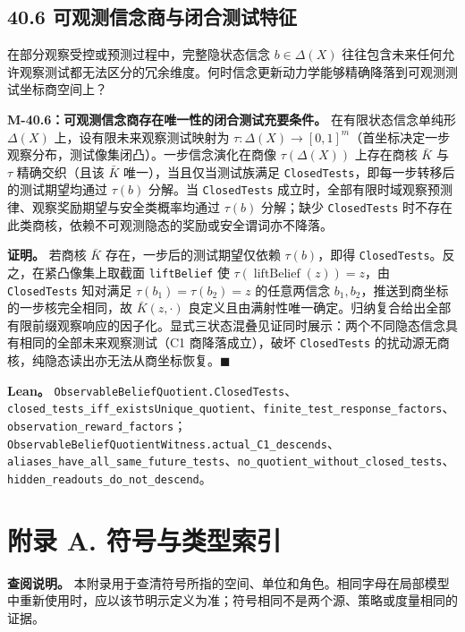 \documentclass[
  11pt,
  oneside]{book}
\begin{document}
\section{40.6 可观测信念商与闭合测试特征}\label{ux53efux89c2ux6d4bux4fe1ux5ff5ux5546ux4e0eux95edux5408ux6d4bux8bd5ux7279ux5f81}

在部分观察受控或预测过程中，完整隐状态信念 \(b\in\Delta(X)\) 往往包含未来任何允许观察测试都无法区分的冗余维度。何时信念更新动力学能够精确降落到可观测测试坐标商空间上？

\hypertarget{m-40-6}{}\label{m-40-6}

\textbf{M-40.6：可观测信念商存在唯一性的闭合测试充要条件。} 在有限状态信念单纯形 \(\Delta(X)\) 上，设有限未来观察测试映射为 \(\tau:\Delta(X)\to[0,1]^m\)（首坐标决定一步观察分布，测试像集闭凸）。一步信念演化在商像 \(\tau(\Delta(X))\) 上存在商核 \(\bar K\) 与 \(\tau\) 精确交织（且该 \(\bar K\) 唯一），当且仅当测试族满足 \texttt{ClosedTests}，即每一步转移后的测试期望均通过 \(\tau(b)\) 分解。当 \texttt{ClosedTests} 成立时，全部有限时域观察预测律、观察奖励期望与安全类概率均通过 \(\tau(b)\) 分解；缺少 \texttt{ClosedTests} 时不存在此类商核，依赖不可观测隐态的奖励或安全谓词亦不降落。

\textbf{证明。} 若商核 \(\bar K\) 存在，一步后的测试期望仅依赖 \(\tau(b)\)，即得 \texttt{ClosedTests}。反之，在紧凸像集上取截面 \texttt{liftBelief} 使 \(\tau(\operatorname{liftBelief}(z))=z\)，由 \texttt{ClosedTests} 知对满足 \(\tau(b_1)=\tau(b_2)=z\) 的任意两信念 \(b_1,b_2\)，推送到商坐标的一步核完全相同，故 \(\bar K(z,\cdot)\) 良定义且由满射性唯一确定。归纳复合给出全部有限前缀观察响应的因子化。显式三状态混叠见证同时展示：两个不同隐态信念具有相同的全部未来观察测试（C1 商降落成立），破坏 \texttt{ClosedTests} 的扰动源无商核，纯隐态读出亦无法从商坐标恢复。\(\blacksquare\)

\textbf{Lean。} \nolinkurl{ObservableBeliefQuotient.ClosedTests}、\nolinkurl{closed_tests_iff_existsUnique_quotient}、\nolinkurl{finite_test_response_factors}、\nolinkurl{observation_reward_factors}；\nolinkurl{ObservableBeliefQuotientWitness.actual_C1_descends}、\nolinkurl{aliases_have_all_same_future_tests}、\nolinkurl{no_quotient_without_closed_tests}、\nolinkurl{hidden_readouts_do_not_descend}。

\chapter{附录 A. 符号与类型索引}\label{appendix-a}

\textbf{查阅说明。} 本附录用于查清符号所指的空间、单位和角色。相同字母在局部模型中重新使用时，应以该节明示定义为准；符号相同不是两个源、策略或度量相同的证据。
\end{document}
